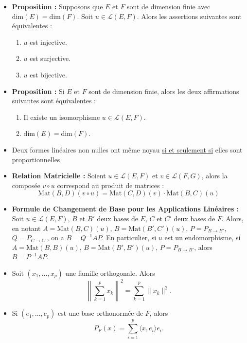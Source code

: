 \documentclass{article}
\begin{document}
\begin{itemize}[label=$\ast$]
\item \textbf{Proposition :} Supposons que \(E\) et \(F\) sont de dimension finie avec \(\text{dim}(E) = \text{dim}(F)\). Soit \(u \in \mathcal{L}(E, F)\). Alors les assertions suivantes sont équivalentes :
\begin{enumerate}
  \item \(u\) est injective.
  \item \(u\) est surjective.
  \item \(u\) est bijective.
\end{enumerate}

\item \textbf{Proposition :} Si \(E\) et \(F\) sont de dimension finie, alors les deux affirmations suivantes sont équivalentes :
\begin{enumerate}
  \item Il existe un isomorphisme \(u \in \mathcal{L}(E, F)\).
  \item \(\text{dim}(E) = \text{dim}(F)\).
\end{enumerate}

\item Deux formes linéaires non nulles ont même noyau \underline{si et seulement si} elles sont proportionnelles

\item \textbf{Relation Matricielle :} Soient \(u \in \mathcal{L}(E, F)\) et \(v \in \mathcal{L}(F, G)\), alors la composée \(v \circ u\) correspond au produit de matrices : \[ \text{Mat}(B, D)(v \circ u) = \text{Mat}(C, D)(v) \cdot \text{Mat}(B, C)(u) \] 

\item \textbf{Formule de Changement de Base pour les Applications Linéaires :} Soit \(u \in \mathcal{L}(E, F)\), \(B\) et \(B'\) deux bases de \(E\), \(C\) et \(C'\) deux bases de \(F\). Alors, en notant \(A = \text{Mat}(B, C)(u)\), \(B = \text{Mat}(B', C')(u)\), \(P = P_{B \to B'}\), \(Q = P_{C \to C'}\), on a \(B = Q^{-1} A P\). En particulier, si \(u\) est un endomorphisme, si \(A = \text{Mat}(B, B)(u)\), \(B = \text{Mat}(B', B')(u)\), \(P = P_{B \to B'}\), alors \(B = P^{-1} A P\).

\item Soit $(x_1, \ldots, x_p)$ une famille orthogonale. Alors  \[ \left\|\sum_{k=1}^{p} x_k \right\|^2 = \sum_{k=1}^{p} \|x_k\|^2. \]

\item Si $(e_1, \ldots, e_p)$ est une base orthonormée de $F$, alors  \[ P_F(x) = \sum_{i=1}^{p} \langle x, e_i \rangle e_i. \]


\end{itemize}
\end{document}
